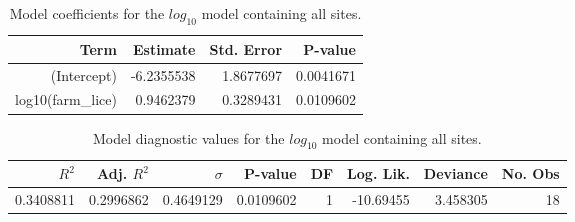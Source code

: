 \begin{table}
\centering
\caption{Model coefficients for the $log_{10}$ model containing all
    sites.}
\centering
\begin{tabular}[t]{rrrr}
\toprule
Term & Estimate & Std. Error & P-value\\
\midrule
(Intercept) & -6.2355538 & 1.8677697 & 0.0041671\\
log10(farm\_lice) & 0.9462379 & 0.3289431 & 0.0109602\\
\bottomrule
\end{tabular}
\end{table}

\begin{table}
\centering
\caption{Model diagnostic values for the $log_{10}$ model containing
    all sites.}
\centering
\begin{tabular}[t]{rrrrrrrr}
\toprule
$R^2$ & Adj. $R^2$ & $\sigma$ & P-value & DF & Log. Lik. & Deviance & No. Obs\\
\midrule
0.3408811 & 0.2996862 & 0.4649129 & 0.0109602 & 1 & -10.69455 & 3.458305 & 18\\
\bottomrule
\end{tabular}
\end{table}
